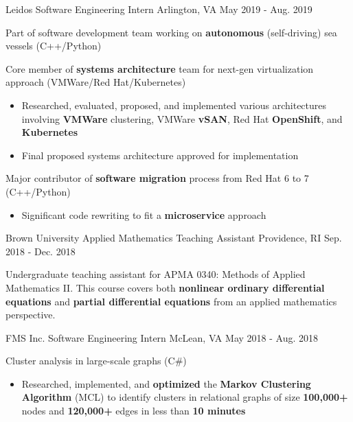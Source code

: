 \begin{cventries}
    \cventry
    {Leidos}
    {Software Engineering Intern}
    {Arlington, VA}
    {May 2019 - Aug. 2019}
    {
        \begin{cvitems}
        \item{Part of software development team working on \textbf{autonomous} (self-driving) sea vessels (C++/Python)}
        \item{Core member of \textbf{systems architecture} team for next-gen virtualization approach (VMWare/Red Hat/Kubernetes)}
            \begin{itemize}
                \item{Researched, evaluated, proposed, and implemented various architectures involving \textbf{VMWare} clustering, VMWare \textbf{vSAN}, Red Hat \textbf{OpenShift}, and \textbf{Kubernetes}}
                \item{Final proposed systems architecture approved for implementation}
            \end{itemize}
        \item{Major contributor of \textbf{software migration} process from Red Hat 6 to 7 (C++/Python)}
            \begin{itemize}
                \item{Significant code rewriting to fit a \textbf{microservice} approach}
            \end{itemize}
        \end{cvitems}
    }
    \cventry
	{Brown University}
	{Applied Mathematics Teaching Assistant}
	{Providence, RI}
	{Sep. 2018 - Dec. 2018}
    {
        \begin{cvitems}
		\item{Undergraduate teaching assistant for APMA 0340: Methods of Applied Mathematics II. This course covers both \textbf{nonlinear ordinary differential equations} and \textbf{partial differential equations} from an applied mathematics perspective.}
        \end{cvitems}
    }
    \cventry
	{FMS Inc.}
    {Software Engineering Intern}
    {McLean, VA}
    {May 2018 - Aug. 2018}
    {
        \begin{cvitems}
		\item{Cluster analysis in large-scale graphs (C\#)}
			\begin{itemize}
				\item{Researched, implemented, and \textbf{optimized} the \textbf{Markov Clustering Algorithm} (MCL) to identify clusters in relational graphs of size \textbf{100,000+} nodes and \textbf{120,000+} edges in less than \textbf{10 minutes}}

\end{itemize}
\end{cvitems}}
\end{cventries}

